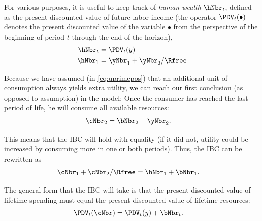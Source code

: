   For various purposes, it is useful to keep track of \textit{human wealth}
  $\hNbr_{t}$, defined as the present discounted value of future labor
  income (the operator $\PDV_{t}(\bullet)$ denotes the present
  discounted value of the variable $\bullet$ from the perspective of the
  beginning of period $t$ through the end of the horizon),
  \begin{equation}\begin{gathered}\begin{aligned}
        \hNbr_{t} & =  \PDV_{t}(y) \label{eq:humw}
        \\  \hNbr_{1} & =  \yNbr_{1}+\yNbr_{2}/\Rfree
      \end{aligned}\end{gathered}\end{equation}

  Because we have assumed (in \eqref{eq:uprimepos}) that an additional
  unit of consumption always yields extra utility,
  we can reach our first conclusion (as opposed to assumption) in the
  model: Once the consumer has reached the last period of life,
  he will consume all available resources:
  \begin{equation}\begin{gathered}\begin{aligned}
        \cNbr_{2} & =  \bNbr_{2}+\yNbr_{2}.
      \end{aligned}\end{gathered}\end{equation}

  This means that the IBC will hold with equality (if it did not, utility
  could be increased by consuming more in one or both periods).  Thus,
  the IBC can be rewritten as
  \begin{equation}\begin{gathered}\begin{aligned}
        \cNbr_{1}+\cNbr_{2}/\Rfree & =  \hNbr_{1}+\bNbr_{1} \label{eq:ibc}.
      \end{aligned}\end{gathered}\end{equation}

  The general form that the IBC will take is that the present
  discounted value of lifetime spending must equal the present
  discounted value of lifetime resources:
  \begin{equation}\begin{gathered}\begin{aligned}
        \PDV_{t}(\cNbr) & =  \PDV_{t}(y)+\bNbr_{t}. \label{eq:ibcgen}
      \end{aligned}\end{gathered}\end{equation}

